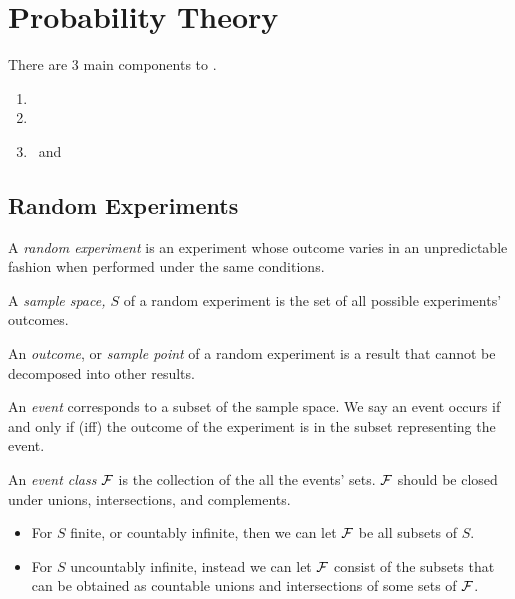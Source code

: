 \section{Probability Theory}\label{sec:Probability Theory}
There are 3 main components to .
\begin{enumerate}
\item {}
\item {}
\item {}~and~
\end{enumerate}

\subsection{Random Experiments}\label{subsec:Random Experiments}
\begin{definition}\label{def:Random Experiment}
  A \emph{random experiment} is an experiment whose outcome varies in an unpredictable fashion when performed under the same conditions.
\end{definition}
\begin{definition}\label{def:Sample Space}
  A \emph{sample space, $S$} of a random experiment is the set of all possible experiments' outcomes.
\end{definition}
\begin{definition}\label{def:Outcome}
  An \emph{outcome}, or \emph{sample point} of a random experiment is a result that cannot be decomposed into other results.
\end{definition}
\begin{definition}[Event]\label{def:Event}
  An \emph{event} corresponds to a subset of the sample space. We say an event occurs if and only if (iff) the outcome of the experiment is in the subset representing the event.
\end{definition}
\begin{definition}\label{def:Event Classes}
  An \emph{event class} $\operatorname{\mathcal{F}}$ is the collection of the all the events' sets. $\operatorname{\mathcal{F}}$ should be closed under unions, intersections, and complements.
  \begin{itemize}[noitemsep, nolistsep]
  \item For $S$ finite, or countably infinite, then we can let $\operatorname{\mathcal{F}}$ be all subsets of $S$.
  \item For $S$ uncountably infinite, instead we can let $\operatorname{\mathcal{F}}$ consist of the subsets that can be obtained as countable unions and intersections of some sets of $\operatorname{\mathcal{F}}$.
  \end{itemize}
\end{definition}
